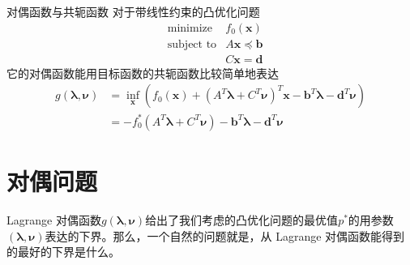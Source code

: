 \begin{frame}

\begin{block}{对偶函数与共轭函数}
对于带线性约束的凸优化问题
\begin{eqnarray*}
& \text{minimize} & f_0(\mathbf{x}) \\
& \text{subject to} & A \mathbf{x} \preccurlyeq \mathbf{b} \\
& & C \mathbf{x} = \mathbf{d}
\end{eqnarray*}
它的对偶函数能用目标函数的共轭函数比较简单地表达
\begin{align*}
g(\boldsymbol\lambda, \boldsymbol\nu) & = \inf\limits_{\mathbf{x}} \left( f_0(\mathbf{x}) +(A^T \boldsymbol\lambda + C^T \boldsymbol\nu)^T \mathbf{x} - \mathbf{b}^T \boldsymbol\lambda - \mathbf{d}^T \boldsymbol\nu \right) \\
& = -f_0^*(A^T \boldsymbol\lambda + C^T \boldsymbol\nu) - \mathbf{b}^T \boldsymbol\lambda - \mathbf{d}^T \boldsymbol\nu
\end{align*}
\end{block}

\end{frame}


\section{对偶问题}


\begin{frame}

\hspace{2em} Lagrange 对偶函数$g(\boldsymbol\lambda, \boldsymbol\nu)$给出了我们考虑的凸优化问题的最优值$p^*$的用参数$(\boldsymbol\lambda, \boldsymbol\nu)$表达的下界。那么，一个自然的问题就是，从
Lagrange 对偶函数能得到的最好的下界是什么。

\end{frame}


